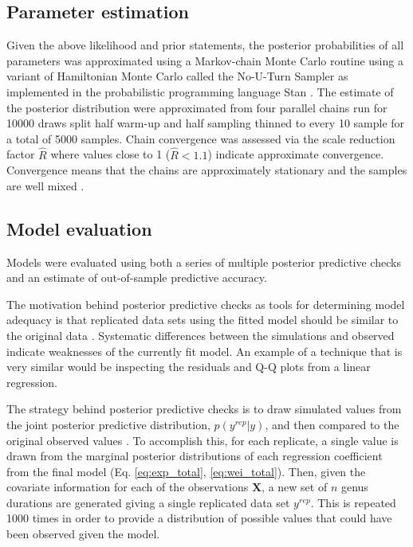 \documentclass[12pt,letterpaper]{article}
\begin{document}
\subsection{Parameter estimation}
Given the above likelihood and prior statements, the posterior probabilities of all parameters was approximated using a Markov-chain Monte Carlo routine using a variant of Hamiltonian Monte Carlo called the No-U-Turn Sampler \citep{Hoffman2014} as implemented in the probabilistic programming language Stan \citep{stan-software:2014}. The estimate of the posterior distribution were approximated from four parallel chains run for 10000 draws split half warm-up and half sampling thinned to every 10 sample for a total of 5000 samples. Chain convergence was assessed via the scale reduction factor \(\hat{R}\) where values close to 1 (\(\hat{R} < 1.1\)) indicate approximate convergence. Convergence means that the chains are approximately stationary and the samples are well mixed \citep{Gelman2013d}.


\subsection{Model evaluation}

Models were evaluated using both a series of multiple posterior predictive checks and an estimate of out-of-sample predictive accuracy. 

The motivation behind posterior predictive checks as tools for determining model adequacy is that replicated data sets using the fitted model should be similar to the original data \citep{Gelman2013d}. Systematic differences between the simulations and observed indicate weaknesses of the currently fit model. An example of a technique that is very similar would be inspecting the residuals and Q-Q plots from a linear regression.

The strategy behind posterior predictive checks is to draw simulated values from the joint posterior predictive distribution, \(p(y^{rep} | y)\), and then compared to the original observed values \citep{Gelman2013d}. To accomplish this, for each replicate, a single value is drawn from the marginal posterior distributions of each regression coefficient from the final model (Eq. \ref{eq:exp_total}, \ref{eq:wei_total}). Then, given the covariate information for each of the observations \(\mathbf{X}\), a new set of \(n\) genus durations are generated giving a single replicated data set \(y^{rep}\). This is repeated 1000 times in order to provide a distribution of possible values that could have been observed given the model. 
\end{document}
